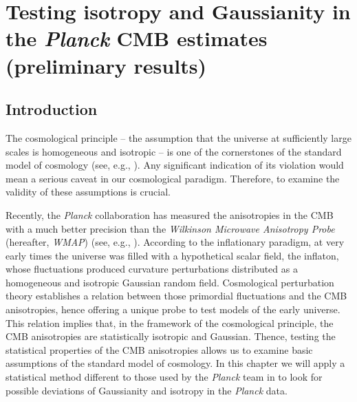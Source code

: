 \chapter{Testing isotropy and Gaussianity in the \textit{Planck} CMB estimates (preliminary results)}
\label{chapter-vsk}

\section{Introduction} 

The cosmological principle -- the assumption that the universe at sufficiently large scales is homogeneous and isotropic -- is one of the cornerstones of the standard model of cosmology (see, e.g., \cite{Robertson:1935zz,Walker1937,Hogg:2004vw}). Any significant indication of its violation would mean a serious caveat in our cosmological paradigm. Therefore, to examine the validity of these assumptions is crucial. 

Recently, the \textit{Planck} collaboration has measured the anisotropies in the CMB with a much better precision than the \textit{Wilkinson Microwave Anisotropy Probe} (hereafter, \textit{WMAP}) (see, e.g., \cite{Spergel:2003cb}). According to the inflationary paradigm, at very early times the universe was filled with a hypothetical scalar field, the inflaton, whose fluctuations produced curvature perturbations distributed as a homogeneous and isotropic Gaussian random field. Cosmological perturbation theory establishes a relation between those primordial fluctuations and the CMB anisotropies, hence offering a unique probe to test models of the early universe. This relation implies that, in the framework of the cosmological principle, the CMB anisotropies are  statistically isotropic and Gaussian. Thence, testing the statistical properties of the CMB anisotropies allows us to examine  basic assumptions of the standard model of cosmology. In this chapter we will apply a statistical method different to those used by the \textit{Planck} team in \cite{Ade:2013nlj} to look for possible deviations of Gaussianity and isotropy in the \textit{Planck} data.

